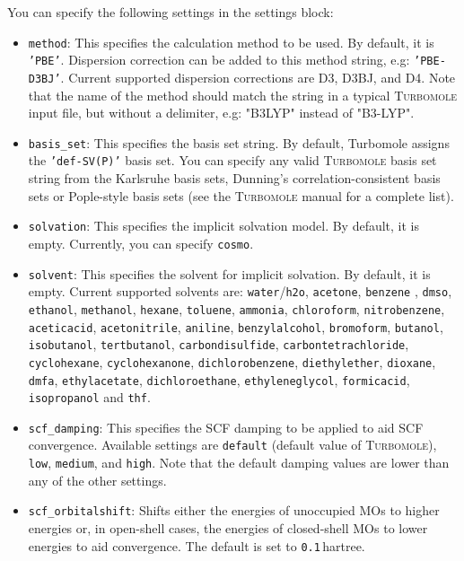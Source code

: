 \documentclass[]{tufte-book}
\begin{document}
You can specify the following settings in the settings block:
\begin{itemize}
\item \texttt{method}:
This specifies the calculation method to be used. By default, it is \texttt{'PBE'}. Dispersion correction can be added to this method string, e.g: \texttt{'PBE-D3BJ'}. Current supported dispersion corrections are D3\cite{grimmeD3}, D3BJ\cite{bjDamping}, and D4\cite{d4Damping}.
Note that the name of the method should match the string in a typical \textsc{Turbomole} input file, but without a delimiter, e.g: "B3LYP" instead of "B3-LYP".
\item \texttt{basis\_set}: This specifies the basis set string. By default, Turbomole assigns the \texttt{'def-SV(P)'} basis set. You can specify any valid \textsc{Turbomole} basis set string from the Karlsruhe basis sets\cite{karlsruheBasisSets}, Dunning's correlation-consistent basis sets\cite{dunningBasisSets} or Pople-style basis sets\cite{popleBasisSets} (see the \textsc{Turbomole} manual for a complete list).
\item \texttt{solvation}: This specifies the implicit solvation model. By default, it is empty. Currently, you can specify \texttt{cosmo}.
\item \texttt{solvent}: This specifies the solvent for implicit solvation. By default, it is empty. Current supported solvents are: \texttt{water}/\texttt{h2o}, \texttt{acetone}, \texttt{benzene}
, \texttt{dmso}, \texttt{ethanol}, \texttt{methanol}, \texttt{hexane}, \texttt{toluene}, \texttt{ammonia}, \texttt{chloroform}, \texttt{nitrobenzene}, \texttt{aceticacid}, \texttt{acetonitrile}, \texttt{aniline}, \texttt{benzylalcohol}, \texttt{bromoform}, \texttt{butanol}, \texttt{isobutanol}, \texttt{tertbutanol}, \texttt{carbondisulfide}, \texttt{carbontetrachloride}, \texttt{cyclohexane}, \texttt{cyclohexanone}, \texttt{dichlorobenzene}, \texttt{diethylether}, \texttt{dioxane}, \texttt{dmfa}, \texttt{ethylacetate}, \texttt{dichloroethane}, \texttt{ethyleneglycol}, \texttt{formicacid}, \texttt{isopropanol} and \texttt{thf}.
\item \texttt{scf\_damping}: This specifies the SCF damping to be applied to aid SCF convergence. Available settings are \texttt{default} (default value of \textsc{Turbomole}), \texttt{low}, \texttt{medium}, and \texttt{high}. Note that the default damping values are lower than any of the other settings.
\item \texttt{scf\_orbitalshift}: Shifts either the energies of unoccupied MOs to higher energies or, in open-shell cases, the energies of closed-shell MOs to lower energies to aid convergence. The default is set to \texttt{0.1}\,hartree.

\end{itemize}
\end{document}
